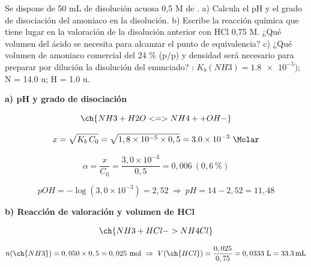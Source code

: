 \begin{exerciseEVAU}
    Se dispone de 50 mL de disolución acuosa 0,5 M de . a) Calcula el pH y el grado de disociación del amoniaco en la disolución. b) Escribe la reacción química que tiene lugar en la valoración de la disolución anterior con HCl 0,75 M. ¿Qué volumen del ácido se necesita para alcanzar el punto de equivalencia? c) ¿Qué volumen de amoniaco comercial del 24 \% (p/p) y densidad   será necesario para preparar por dilución la disolución del enunciado?
    \datos{}: \(K_b(NH3)=\num{1.8e-5}\)); N = \num{14.0} u; H = \num{1.0} u.

    \begin{solu}


        \textbf{a) pH y grado de disociación}

        \begin{equation*}
            \ch{NH3 + H2O <=> NH4+ + OH-}
        \end{equation*}

        \begin{equation*}
            x = \sqrt{K_b\, C_0} = \sqrt{1,8\times10^{-5}\times0,5} = \num{3.0e-3} \ \si{\Molar}
        \end{equation*}

        \begin{equation*}
            \alpha = \dfrac{x}{C_0} = \dfrac{3,0\times10^{-3}}{0,5} = 0,006 \ (0,6\ \%)
        \end{equation*}

        \begin{equation*}
            pOH = -\log(3,0\times10^{-3}) = 2,52 \ \Rightarrow \ pH = 14-2,52 = 11,48
        \end{equation*}

        \textbf{b) Reacción de valoración y volumen de HCl}

        \begin{equation*}
            \ch{NH3 + HCl -> NH4Cl}
        \end{equation*}

        \begin{equation*}
            n(\ch{NH3}) = 0,050\times0,5 = 0,025 \ \text{mol} \ \Rightarrow \ V(\ch{HCl}) = \dfrac{0,025}{0,75} = 0,0333 \ \si{\litre} = \SI{33.3}{\milli\litre}
        \end{equation*}


\end{solu}
\end{exerciseEVAU}
